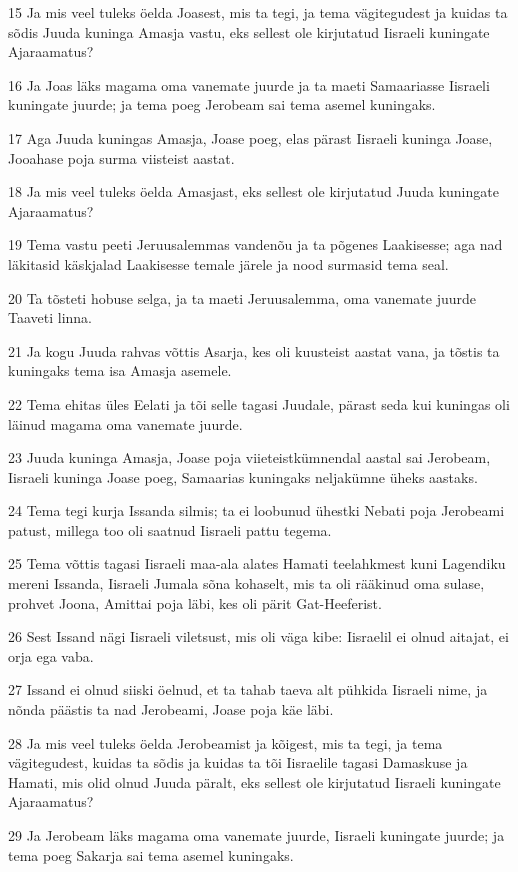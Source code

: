 \par 15 Ja mis veel tuleks öelda Joasest, mis ta tegi, ja tema vägitegudest ja kuidas ta sõdis Juuda kuninga Amasja vastu, eks sellest ole kirjutatud Iisraeli kuningate Ajaraamatus?
\par 16 Ja Joas läks magama oma vanemate juurde ja ta maeti Samaariasse Iisraeli kuningate juurde; ja tema poeg Jerobeam sai tema asemel kuningaks.
\par 17 Aga Juuda kuningas Amasja, Joase poeg, elas pärast Iisraeli kuninga Joase, Jooahase poja surma viisteist aastat.
\par 18 Ja mis veel tuleks öelda Amasjast, eks sellest ole kirjutatud Juuda kuningate Ajaraamatus?
\par 19 Tema vastu peeti Jeruusalemmas vandenõu ja ta põgenes Laakisesse; aga nad läkitasid käskjalad Laakisesse temale järele ja nood surmasid tema seal.
\par 20 Ta tõsteti hobuse selga, ja ta maeti Jeruusalemma, oma vanemate juurde Taaveti linna.
\par 21 Ja kogu Juuda rahvas võttis Asarja, kes oli kuusteist aastat vana, ja tõstis ta kuningaks tema isa Amasja asemele.
\par 22 Tema ehitas üles Eelati ja tõi selle tagasi Juudale, pärast seda kui kuningas oli läinud magama oma vanemate juurde.
\par 23 Juuda kuninga Amasja, Joase poja viieteistkümnendal aastal sai Jerobeam, Iisraeli kuninga Joase poeg, Samaarias kuningaks neljakümne üheks aastaks.
\par 24 Tema tegi kurja Issanda silmis; ta ei loobunud ühestki Nebati poja Jerobeami patust, millega too oli saatnud Iisraeli pattu tegema.
\par 25 Tema võttis tagasi Iisraeli maa-ala alates Hamati teelahkmest kuni Lagendiku mereni Issanda, Iisraeli Jumala sõna kohaselt, mis ta oli rääkinud oma sulase, prohvet Joona, Amittai poja läbi, kes oli pärit Gat-Heeferist.
\par 26 Sest Issand nägi Iisraeli viletsust, mis oli väga kibe: Iisraelil ei olnud aitajat, ei orja ega vaba.
\par 27 Issand ei olnud siiski öelnud, et ta tahab taeva alt pühkida Iisraeli nime, ja nõnda päästis ta nad Jerobeami, Joase poja käe läbi.
\par 28 Ja mis veel tuleks öelda Jerobeamist ja kõigest, mis ta tegi, ja tema vägitegudest, kuidas ta sõdis ja kuidas ta tõi Iisraelile tagasi Damaskuse ja Hamati, mis olid olnud Juuda päralt, eks sellest ole kirjutatud Iisraeli kuningate Ajaraamatus?
\par 29 Ja Jerobeam läks magama oma vanemate juurde, Iisraeli kuningate juurde; ja tema poeg Sakarja sai tema asemel kuningaks.

